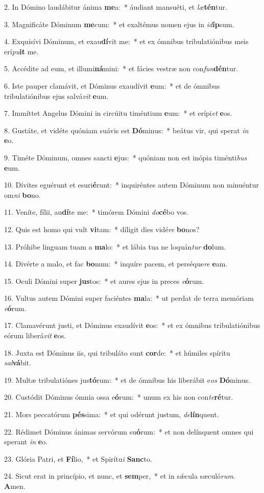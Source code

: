 2. In Dómino laudábitur ánima \textbf{me}a:~*  áudiant mansuéti, et \textit{læ}\textbf{tén}tur.\

3. Magnificáte Dóminum \textbf{me}cum:~*  et exaltémus nomen ejus in \textit{id}\textbf{íp}sum.\

4. Exquisívi Dóminum, et exau\textbf{dí}vit me:~*  et ex ómnibus tribulatiónibus meis erí\textit{pu}\textbf{it} me.\

5. Accédite ad eum, et illumi\textbf{ná}mini:~*  et fácies vestræ non con\textit{fun}\textbf{dén}tur.\

6. Iste pauper clamávit, et Dóminus exaudívit \textbf{e}um:~*  et de ómnibus tribulatiónibus ejus salvá\textit{vit} \textbf{e}um.\

7. Immíttet Angelus Dómini in circúitu timéntium \textbf{e}um:~*  et erípi\textit{et} \textbf{e}os.\

8. Gustáte, et vidéte quóniam suávis est \textbf{Dó}minus:~*  beátus vir, qui sperat \textit{in} \textbf{e}o.\

9. Timéte Dóminum, omnes sancti \textbf{e}jus:~*  quóniam non est inópia timénti\textit{bus} \textbf{e}um.\

10. Dívites eguérunt et esuri\textbf{é}runt:~*  inquiréntes autem Dóminum non minuéntur om\textit{ni} \textbf{bo}no.\

11. Veníte, fílii, au\textbf{dí}te me:~*  timórem Dómini \textit{do}\textbf{cé}bo vos.\

12. Quis est homo qui vult \textbf{vi}tam:~*  díligit dies vidé\textit{re} \textbf{bo}nos?\

13. Próhibe linguam tuam a \textbf{ma}lo:~*  et lábia tua ne loquán\textit{tur} \textbf{do}lum.\

14. Divérte a malo, et fac \textbf{bo}num:~*  inquíre pacem, et perséque\textit{re} \textbf{e}am.\

15. Oculi Dómini super \textbf{jus}tos:~*  et aures ejus in preces \textit{e}\textbf{ó}rum.\

16. Vultus autem Dómini super faciéntes \textbf{ma}la:~*  ut perdat de terra memóriam \textit{e}\textbf{ó}rum.\

17. Clamavérunt justi, et Dóminus exaudívit \textbf{e}os:~*  et ex ómnibus tribulatiónibus eórum liberá\textit{vit} \textbf{e}os.\

18. Juxta est Dóminus iis, qui tribuláto sunt \textbf{cor}de:~*  et húmiles spíritu \textit{sal}\textbf{vá}bit.\

19. Multæ tribulatiónes jus\textbf{tó}rum:~*  et de ómnibus his liberábit e\textit{os} \textbf{Dó}minus.\

20. Custódit Dóminus ómnia ossa e\textbf{ó}rum:~*  unum ex his non con\textit{te}\textbf{ré}tur.\

21. Mors peccatórum \textbf{pés}sima:~*  et qui odérunt justum, \textit{de}\textbf{lín}quent.\

22. Rédimet Dóminus ánimas servórum su\textbf{ó}rum:~*  et non delínquent omnes qui sperant \textit{in} \textbf{e}o.\

23. Glória Patri, et \textbf{Fí}lio,~*  et Spirítu\textit{i} \textbf{Sanc}to.\

24. Sicut erat in princípio, et nunc, et \textbf{sem}per,~*  et in sǽcula sæculó\textit{rum}. \textbf{A}men.\

